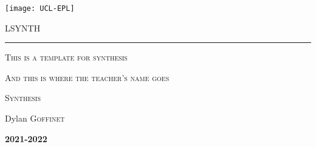 \documentclass{report}
\begin{document}

\begin{titlepage}
	\flushleft\texttt{[image: UCL-EPL]}\\
	\vspace*{2cm}
	\vspace*{\fill}
	\centering
	{\scshape\LARGE LSYNTH \par}
	\vspace{0.4cm}
	{\color{clearBlue}\rule{0.7\textwidth}{1pt}\par}
	\vspace{0.5cm}
	{\scshape\Large This is a template for synthesis \par}
	\vspace{0.5cm}
	{\scshape\large And this is where the teacher's name goes\par}
	\vspace{1cm}
	{\scshape\large Synthesis \par}
	{\Large\itshape\par}
	\vspace*{\fill}
	\vfill
	\vfill
	{\Large Dylan \textsc{Goffinet}\par}
	\vspace{0.5cm}
	{\Large\bfseries 2021-2022\par}
	{\large \par}
\end{titlepage}


\setcounter{tocdepth}{1} %
\tableofcontents
\clearpage




\end{document}
